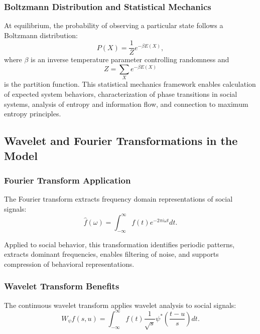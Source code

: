 \documentclass[11pt,a4paper]{article}
\begin{document}
\subsubsection{Boltzmann Distribution and Statistical Mechanics}

At equilibrium, the probability of observing a particular state follows a Boltzmann distribution:
\begin{equation}
P(X) = \frac{1}{Z} e^{-\beta E(X)},
\end{equation}
where $\beta$ is an inverse temperature parameter controlling randomness and
\begin{equation}
Z = \sum_X e^{-\beta E(X)}
\end{equation}
is the partition function. This statistical mechanics framework enables calculation of expected system behaviors, characterization of phase transitions in social systems, analysis of entropy and information flow, and connection to maximum entropy principles.

\subsection{Wavelet and Fourier Transformations in the Model}

\subsubsection{Fourier Transform Application}

The Fourier transform extracts frequency domain representations of social signals:
\begin{equation}
\hat{f}(\omega) = \int_{-\infty}^{\infty} f(t)e^{-2\pi i\omega t} dt.
\end{equation}

Applied to social behavior, this transformation identifies periodic patterns, extracts dominant frequencies, enables filtering of noise, and supports compression of behavioral representations.

\subsubsection{Wavelet Transform Benefits}

The continuous wavelet transform applies wavelet analysis to social signals:
\begin{equation}
W_\psi f(s, u) = \int_{-\infty}^{\infty} f(t) \frac{1}{\sqrt{s}} \psi^*\left(\frac{t - u}{s}\right) dt.
\end{equation}
\end{document}

